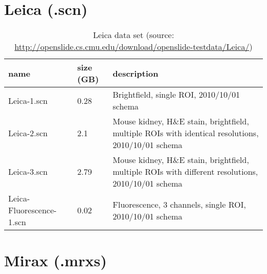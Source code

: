 \section{Leica (.scn)}

\begin{table}[H]
	\begin{center}
		\begin{tabular}{| p{4cm} | p{2cm} | p{5cm} |}
			\hline
			\textbf{name} & \textbf{size (GB)} & \textbf{description} \\ \hline
			Leica-1.scn & 0.28 & Brightfield, single ROI, 2010/10/01 schema \\ \hline
			Leica-2.scn & 2.1 & Mouse kidney, H\&E stain, brightfield, multiple ROIs with identical resolutions, 2010/10/01 schema \\ \hline
			Leica-3.scn	 & 2.79 & Mouse kidney, H\&E stain, brightfield, multiple ROIs with different resolutions, 2010/10/01 schema \\ \hline
			Leica-Fluorescence-1.scn & 0.02 & Fluorescence, 3 channels, single ROI, 2010/10/01 schema \\ \hline
		\end{tabular}
		\caption{Leica data set (source: \url{http://openslide.cs.cmu.edu/download/openslide-testdata/Leica/})}
	\end{center}
\end{table}


\section{Mirax (.mrxs)}

